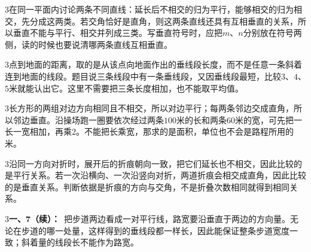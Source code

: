 \documentclass[multi=snippet,border={5bp 20bp 5bp 5bp}]{standalone}
\newenvironment{snippet}[3]{\begin{minipage}{#1bp}\color{answerred}\fontsize{#2}{#3}\selectfont\raggedright}{\end{minipage}}
\begin{document}
\begin{snippet}{505}{11.5}{14}\begin{multicols}{3}\raggedcolumns 在同一平面内讨论两条不同直线：延长后不相交的归为平行，能够相交的归为相交，先分成这两类。若交角恰好是直角，则这两条直线还具有互相垂直的关系，所以垂直不能与平行、相交并列成三类。写垂直符号时，应把\(m\)\allowbreak 、\(n\)\allowbreak 分别放在符号两侧，读的时候也要说清哪两条直线互相垂直。\end{multicols}\end{snippet}
\begin{snippet}{505}{11.5}{14}\begin{multicols}{3}\raggedcolumns 点到地面的距离，取的是从该点向地面作出的垂线段长度，而不是任意一条斜着连到地面的线段。题目说三条线段中有一条垂线段，又因垂线段最短，比较\(3\)\allowbreak 、\(4\)\allowbreak 、\(5\)\allowbreak 米就能认出它。这里不需要把三条长度相加，也不能取平均值。\end{multicols}\end{snippet}
\begin{snippet}{505}{11.5}{14}\begin{multicols}{3}\raggedcolumns 长方形的两组对边方向相同且不相交，所以对边平行；每两条邻边交成直角，所以邻边垂直。沿操场跑一圈要依次经过两条\(100\)\allowbreak 米的长和两条\(60\)\allowbreak 米的宽，可先把一长一宽相加，再乘\(2\)\allowbreak 。不能把长乘宽，那求的是面积，单位也不会是路程所用的米。\end{multicols}\end{snippet}
\begin{snippet}{505}{11.5}{14}\begin{multicols}{3}\raggedcolumns 沿同一方向对折时，展开后的折痕朝向一致，把它们延长也不相交，因此比较的是平行关系。若一次沿横向、一次沿竖向对折，两道折痕会相交成直角，因此比较的是垂直关系。判断依据是折痕的方向与交角，不是折叠次数相同就得到相同关系。\end{multicols}\end{snippet}
\begin{snippet}{505}{11.5}{14}\begin{multicols}{3}\raggedcolumns \textbf{一、7（续）：}\ 把步道两边看成一对平行线，路宽要沿垂直于两边的方向量。无论在步道的哪一处量，这样得到的垂线段都一样长，因此能保证整条步道宽度一致；斜着量的线段长不能作为路宽。\end{multicols}\end{snippet}
\end{document}

